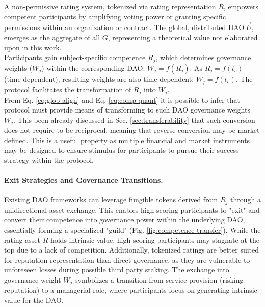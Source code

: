 \documentclass{article}
\begin{document}
\begin{CJK}{UTF8}{gbsn}
\begin{multicols}{2}
            A non-permissive rating system, tokenized via rating representation $R$, empowers competent participants by amplifying voting power or granting specific permissions within an organization or contract. The global, distributed DAO $\vec{U}$, emerges as the aggregate of all $G$, representing a theoretical value not elaborated upon in this work. \\
            Participants gain subject-specific competence $R_{j}$, which determines governance weights ($W_j$) within the corresponding DAO: $W_j = f(R_{j})$. As $R_j=f(t_c)$ (time-dependent), resulting weights are also time-dependent: $W_j=f(t_c)$. The protocol facilitates the transformation of $R_j$ into $W_j$.
            \\From Eq. \ref{eq:glob-align} and Eq. \ref{eq:comp-quant} it is possible to infer that protocol must provide means of transforming  to such DAO governance weights $W_j$.  This been already discussed in Sec. \ref{sec:transferability} that such conversion does not require to be reciprocal, meaning that reverse conversion may be market defined. This is a useful property as multiple financial and market instruments may be designed to ensure stimulus for participants to pursue their success strategy within the protocol.  \\ 
            \paragraph{Exit Strategies and Governance Transitions.}
            Existing DAO frameworks can leverage fungible tokens derived from $R_{j}$ through a unidirectional asset exchange. This enables high-scoring participants to "exit" and convert their competence into governance power within the underlying DAO, essentially forming a specialized "guild" (Fig. \ref{fig:competence-transfer}).
            While the rating asset $R$ holds intrinsic value, high-scoring participants may stagnate at the top due to a lack of competition. Additionally, tokenized ratings are better suited for reputation representation than direct governance, as they are vulnerable to unforeseen losses during possible third party staking. The exchange into governance weight $W_j$ symbolizes a transition from service provision (risking reputation) to a managerial role, where participants focus on generating intrinsic value for the DAO.

\end{multicols}
\end{CJK}
\end{document}
